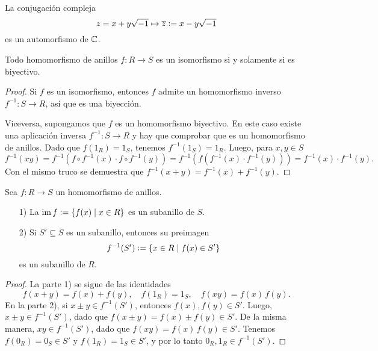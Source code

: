 \begin{ejemplo}
  La conjugación compleja
  $$z = x + y\sqrt{-1} \mapsto \overline{z} \mathrel{\mathop:}= x - y\sqrt{-1}$$
  es un automorfismo de $\mathbb{C}$.
\end{ejemplo}

\begin{observacion}
  Todo homomorfismo de anillos $f\colon R\to S$ es un isomorfismo si y solamente
  si es biyectivo.

  \begin{proof}
    Si $f$ es un isomorfismo, entonces $f$ admite un homomorfismo inverso
    $f^{-1}\colon S\to R$, así que es una biyección.

    Viceversa, supongamos que $f$ es un homomorfismo biyectivo. En este caso
    existe una aplicación inversa $f^{-1}\colon S\to R$ y hay que comprobar que
    es un homomorfismo de anillos. Dado que $f (1_R) = 1_S$, tenemos
    $f^{-1} (1_S) = 1_R$. Luego, para $x,y\in S$
    \[ f^{-1} (xy) =
       f^{-1} (f\circ f^{-1} (x)\cdot f\circ f^{-1} (y)) =
       f^{-1} (f (f^{-1} (x)\cdot f^{-1} (y))) =
       f^{-1} (x)\cdot f^{-1} (y). \]
    Con el mismo truco se demuestra que
    $f^{-1} (x + y) = f^{-1} (x) + f^{-1} (y)$.
  \end{proof}
\end{observacion}

\begin{observacion}
  Sea $f\colon R\to S$ un homomorfismo de anillos.

  \begin{enumerate}
  \item[1)] La 
    $\operatorname{im} f \mathrel{\mathop:}= \{ f (x) \mid x\in R \}$ es un subanillo de $S$.

  \item[2)] Si $S' \subseteq S$ es un subanillo, entonces su preimagen
    $$f^{-1} (S') \mathrel{\mathop:}= \{ x\in R \mid f (x) \in S' \}$$
    es un subanillo de $R$.
  \end{enumerate}

  \begin{proof}
    La parte 1) se sigue de las identidades
    \[ f (x+y) = f(x) + f (y), \quad
       f (1_R) = 1_S, \quad
       f (xy) = f(x)\,f(y). \]
    En la parte 2), si $x \pm y \in f^{-1} (S')$, entonces
    $f (x), f (y) \in S'$. Luego, $x \pm y \in f^{-1} (S')$, dado que
    $f (x\pm y) = f (x) \pm f (y) \in S'$. De la misma manera,
    $xy \in f^{-1} (S')$, dado que $f (xy) = f (x)\,f (y) \in S'$. Tenemos
    $f (0_R) = 0_S \in S'$ y $f (1_R) = 1_S \in S'$, y por lo tanto
    $0_R, 1_R \in f^{-1} (S')$.
  \end{proof}
\end{observacion}

